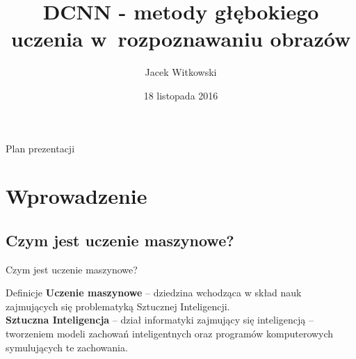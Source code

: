 \documentclass[xcolor=dvipsnames]{beamer}
\title[Metody głębokiego uczenia]{DCNN - metody głębokiego uczenia w~rozpoznawaniu obrazów}
\subtitle[]{}
\author[J. Witkowski]{Jacek Witkowski}
\institute[SMD2]{
  Prezentacja w~ramach przedmiotu: Seminarium Dyplomowe 2
}
\date[Listopad 2016]{18 listopada 2016}
\begin{document}
\begin{frame}[plain]
  \titlepage
\end{frame}

\begin{frame}{Plan prezentacji}
  \tableofcontents
\end{frame}

\section{Wprowadzenie}
\subsection{Czym jest uczenie maszynowe?}
\begin{frame}{Czym jest uczenie maszynowe?}
  \begin{block}{Definicje}
    \textbf{Uczenie maszynowe} -- dziedzina wchodząca w skład nauk zajmujących się problematyką Sztucznej Inteligencji.\\
    \vspace{2mm}
    \textbf{Sztuczna Inteligencja} -- dział informatyki zajmujący się inteligencją – tworzeniem modeli zachowań inteligentnych oraz programów komputerowych symulujących te zachowania.\\
    \vspace{5mm}
    \hspace*{}
  \end{block}
\end{frame}
\end{document}
